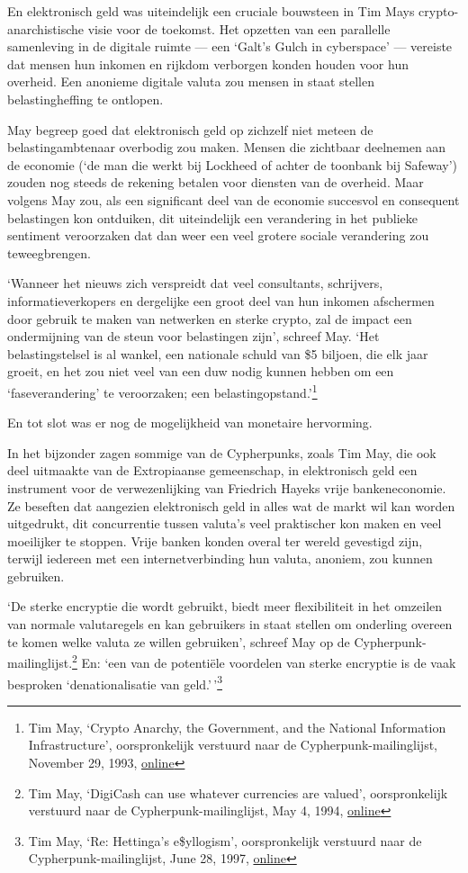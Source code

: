 \documentclass[
  a5paper,
  smalldemyvopaper,11pt,twoside,onecolumn,openright,extrafontsizes,
hidelinks]{memoir}
\begin{document}
En elektronisch geld was uiteindelijk een cruciale bouwsteen in Tim Mays
crypto-anarchistische visie voor de toekomst. Het opzetten van een
parallelle samenleving in de digitale ruimte --- een `Galt's Gulch in
cyberspace' --- vereiste dat mensen hun inkomen en rijkdom verborgen
konden houden voor hun overheid. Een anonieme digitale valuta zou mensen
in staat stellen belastingheffing te ontlopen.

May begreep goed dat elektronisch geld op zichzelf niet meteen de
belastingambtenaar overbodig zou maken. Mensen die zichtbaar deelnemen
aan de economie (`de man die werkt bij Lockheed of achter de toonbank
bij Safeway') zouden nog steeds de rekening betalen voor diensten van de
overheid. Maar volgens May zou, als een significant deel van de economie
succesvol en consequent belastingen kon ontduiken, dit uiteindelijk een
verandering in het publieke sentiment veroorzaken dat dan weer een veel
grotere sociale verandering zou teweegbrengen.

`Wanneer het nieuws zich verspreidt dat veel consultants, schrijvers,
informatieverkopers en dergelijke een groot deel van hun inkomen
afschermen door gebruik te maken van netwerken en sterke crypto, zal de
impact een ondermijning van de steun voor belastingen zijn', schreef
May. `Het belastingstelsel is al wankel, een nationale schuld van \$5
biljoen, die elk jaar groeit, en het zou niet veel van een duw nodig
kunnen hebben om een `faseverandering' te veroorzaken; een
belastingopstand.'\footnote{Tim May, `Crypto Anarchy, the Government,
  and the National Information Infrastructure', oorspronkelijk verstuurd
  naar de Cypherpunk-mailinglijst, November 29, 1993,
  \href{https://cypherpunks.venona.com/date/1993/11/msg01106.html}{online}}

En tot slot was er nog de mogelijkheid van monetaire hervorming.

In het bijzonder zagen sommige van de Cypherpunks, zoals Tim May, die
ook deel uitmaakte van de Extropiaanse gemeenschap, in elektronisch geld
een instrument voor de verwezenlijking van Friedrich Hayeks vrije
bankeneconomie. Ze beseften dat aangezien elektronisch geld in alles wat
de markt wil kan worden uitgedrukt, dit concurrentie tussen valuta's
veel praktischer kon maken en veel moeilijker te stoppen. Vrije banken
konden overal ter wereld gevestigd zijn, terwijl iedereen met een
internetverbinding hun valuta, anoniem, zou kunnen gebruiken.

`De sterke encryptie die wordt gebruikt, biedt meer flexibiliteit in het
omzeilen van normale valutaregels en kan gebruikers in staat stellen om
onderling overeen te komen welke valuta ze willen gebruiken', schreef
May op de Cypherpunk-mailinglijst.\footnote{Tim May, `DigiCash can use
  whatever currencies are valued', oorspronkelijk verstuurd naar de
  Cypherpunk-mailinglijst, May 4, 1994,
  \href{https://cypherpunks.venona.com/date/1994/05/msg00243.html}{online}}
En: `een van de potentiële voordelen van sterke encryptie is de vaak
besproken `denationalisatie van geld.'\,'\footnote{Tim May, `Re:
  Hettinga's e\$yllogism', oorspronkelijk verstuurd naar de
  Cypherpunk-mailinglijst, June 28, 1997,
  \href{https://cypherpunks.venona.com/date/1997/06/msg01637.html}{online}}
\end{document}
